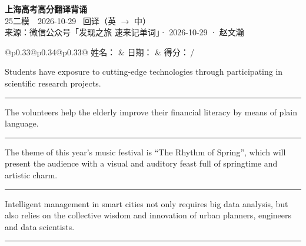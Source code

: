 \documentclass[11pt,a4paper]{article}
\newcommand{\num}[1]{\makebox[1.9em][r]{#1.}\hspace{0.3em}}
\newcommand{\wline}{\noindent\rule{\linewidth}{0.4pt}}
\begin{document}
\pagestyle{plain}
\begin{center}
{\LARGE\bfseries 上海高考高分翻译背诵 }\\[0.25em]
{\large 25二模　2026-10-29 \quad\ 回译（英 $\to$ 中）}\\[0.35em]
{\footnotesize 来源：微信公众号「发现之旅 速来记单词」· 2026-10-29 · 赵文瀚}
\end{center}

\vspace{0.4em}
\noindent\begin{tabular}{@{}p{0.33\textwidth}@{}p{0.34\textwidth}@{}p{0.33\textwidth}@{}}
姓名：\underline{\hspace{2.0cm}} & 日期：\underline{\hspace{2.0cm}} & 得分：\underline{\hspace{1.4cm}}\,/ \\
\end{tabular}

\vspace{0.5em}

\vspace{0.8em}
\num{1}Students have exposure to cutting-edge technologies through participating in scientific research projects.

\vspace{0.25em}

\wline

\num{2}The volunteers help the elderly improve their financial literacy by means of plain language.

\vspace{0.25em}

\wline

\num{3}The theme of this year’s music festival is “The Rhythm of Spring”, which will present the audience with a visual and auditory feast full of springtime and artistic charm.

\vspace{0.25em}

\wline

\num{4}Intelligent management in smart cities not only requires big data analysis, but also relies on the collective wisdom and innovation of urban planners, engineers and data scientists.

\vspace{0.25em}

\wline
\end{document}
